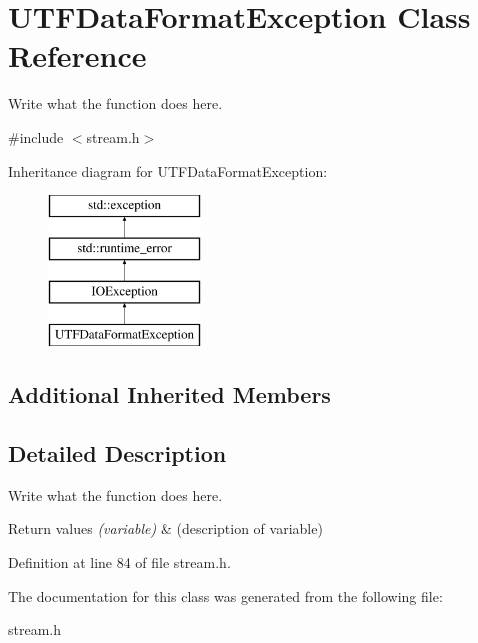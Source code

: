 \hypertarget{classUTFDataFormatException}{\section{U\+T\+F\+Data\+Format\+Exception Class Reference}
\label{classUTFDataFormatException}
}


Write what the function does here.  




{\ttfamily \#include $<$stream.\+h$>$}

Inheritance diagram for U\+T\+F\+Data\+Format\+Exception\+:\begin{figure}[H]
\begin{center}
\leavevmode
\includegraphics[height=4.000000cm]{classUTFDataFormatException}
\end{center}
\end{figure}
\subsection*{Additional Inherited Members}


\subsection{Detailed Description}
Write what the function does here. 


\begin{DoxyRetVals}{Return values}
{\em (variable)} & (description of variable) \\
\hline
\end{DoxyRetVals}


Definition at line 84 of file stream.\+h.



The documentation for this class was generated from the following file\+:\begin{DoxyCompactItemize}
\item 
stream.\+h\end{DoxyCompactItemize}
